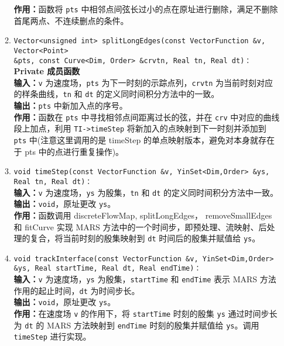 \documentclass[a4paper,twoside]{ctexart}
\begin{document}
\begin{itemize}
\begin{enumerate}[(1)]
                \textbf{作用：}函数将 \texttt{pts} 中相邻点间弦长过小的点在原址进行删除，满足不删除首尾两点、不连续删点的条件。
                \item \texttt{Vector<unsigned int> splitLongEdges(const VectorFunction \&v, Vector<Point> \\\&pts, const Curve<Dim, Order> \&crvtn, Real tn, Real dt)：}\\
                \textbf{Private 成员函数}\\
                \textbf{输入：}\texttt{v} 为速度场，\texttt{pts} 为下一时刻的示踪点列，\texttt{crvtn} 为当前时刻对应的样条曲线，\texttt{tn} 和 \texttt{dt} 的定义同时间积分方法中的一致。\\
                \textbf{输出：}\texttt{pts} 中新加入点的序号。\\
                \textbf{作用：}函数在 \texttt{pts} 中寻找相邻点间距离过长的弦，并在 \texttt{crv} 中对应的曲线段上加点，利用 \texttt{TI->timeStep} 将新加入的点映射到下一时刻并添加到 \texttt{pts} 中(注意这里调用的是 timeStep 的单点映射版本，避免对本身就存在于 pts 中的点进行重复操作)。
                \item \texttt{void timeStep(const VectorFunction \&v, YinSet<Dim,Order> \&ys, Real tn, Real dt)：}\\
                \textbf{输入：}\texttt{v} 为速度场，\texttt{ys} 为殷集，\texttt{tn} 和 \texttt{dt} 的定义同时间积分方法中一致。\\
                \textbf{输出：}\texttt{void}，原址更改 \texttt{ys}。\\
                \textbf{作用：}函数调用 discreteFlowMap, splitLongEdges， removeSmallEdges 和 fitCurve 实现 MARS 方法中的一个时间步，即预处理、流映射、后处理的复合，将当前时刻的殷集映射到 \texttt{dt} 时间后的殷集并赋值给 \texttt{ys}。
                \item \texttt{void trackInterface(const VectorFunction \&v, YinSet<Dim,Order> \&ys, Real startTime, Real dt, Real endTime)：}\\
                \textbf{输入：}\texttt{v} 为速度场，\texttt{ys} 为殷集，\texttt{startTime} 和 \texttt{endTime} 表示 MARS 方法作用的起止时间，\texttt{dt} 为时间步长。\\
                \textbf{输出：}\texttt{void}，原址更改 \texttt{ys}。\\
                \textbf{作用：}在速度场 \texttt{v} 的作用下，将 \texttt{startTime} 时刻的殷集 \texttt{ys} 通过时间步长为 \texttt{dt} 的 MARS 方法映射到 \texttt{endTime} 时刻的殷集并赋值给 \texttt{ys}。调用 \texttt{timeStep} 进行实现。
            \end{enumerate}
          \end{itemize}




\end{document}

